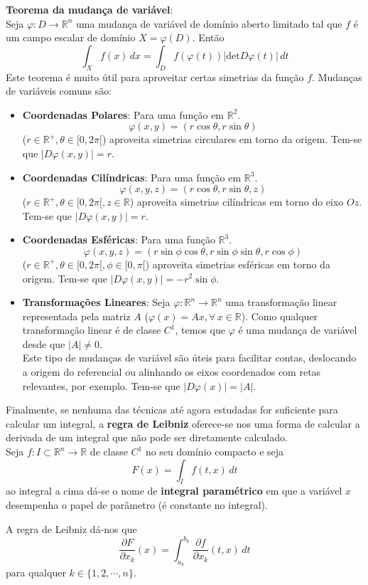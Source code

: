 \documentclass{article}
\newcommand{\R}{\mathbb{R}}
\begin{document}
\textbf{Teorema da mudança de variável}:\\
Seja $\varphi: D \to \R^n$ uma mudança de variável de domínio aberto limitado tal que $f$ é um campo escalar de domínio $X=\varphi(D)$. Então
$$
\int_X f(x) \, dx = \int_D f(\varphi(t)) |\text{det} D \varphi(t)| \, dt
$$
Este teorema é muito útil para aproveitar certas simetrias da função $f$. Mudanças de variáveis comuns são:
\begin{itemize}
	\item \textbf{Coordenadas Polares}: Para uma função em $\R^2$.
	$$ \varphi (x,y) = (r \cos \theta, r \sin \theta) $$
	($r \in \R^+, \theta \in [0, 2\pi[$) aproveita simetrias circulares em torno da origem. Tem-se que $|D\varphi(x,y)| = r$.
	\item \textbf{Coordenadas Cilíndricas}: Para uma função em $\R^3$.
	$$ \varphi(x,y,z) = (r \cos \theta, r \sin \theta, z) $$
	($r \in \R^+, \theta \in [0,2\pi[, z \in \R$) aproveita simetrias cilíndricas em torno do eixo $Oz$. Tem-se que $|D\varphi(x,y)| = r$.
	\item \textbf{Coordenadas Esféricas}: Para uma função $\R^3$.
	$$ \varphi (x,y,z) = (r \sin \phi \cos \theta, r\sin \phi \sin \theta, r \cos \phi)	$$
	($r \in \R^+, \theta \in [0,2\pi[, \phi \in [0,\pi[$) aproveita simetrias esféricas em torno da origem. Tem-se que $|D\varphi(x,y)| = -r^2 \sin \phi$.
	\item \textbf{Transformações Lineares}: Seja $\varphi: \R^n \to \R^n$ uma transformação linear representada pela matriz $A$ ($\varphi(x) = Ax, \forall \, x \in \R$). Como qualquer transformação linear é de classe $C^1$, temos que $\varphi$ é uma mudança de variável desde que $|A| \neq 0$.\\
	Este tipo de mudanças de variável são úteis para facilitar contas, deslocando a origem do referencial ou alinhando os eixos coordenados com retas relevantes, por exemplo. Tem-se que $|D\varphi(x)|=|A|$. 
\end{itemize}
Finalmente, se nenhuma das técnicas até agora estudadas for suficiente para calcular um integral, a \textbf{regra de Leibniz} oferece-se nos uma forma de calcular a derivada de um integral que não pode ser diretamente calculado.\\
Seja $f: I \subset \R^n \to \R$ de classe $C^1$ no seu domínio compacto e seja 
$$
F(x) = \int_I f(t,x) \, dt
$$
ao integral a cima dá-se o nome de \textbf{integral paramétrico} em que a variável $x$ desempenha o papel de parâmetro (é constante no integral).

A regra de Leibniz dá-nos que
$$
\frac{\partial F}{\partial x_k} (x) = \int_{a_k}^{b_k} \frac{\partial f}{\partial x_k} (t,x) \, dt
$$
para qualquer $k \in \{ 1, 2, \cdots , n \}$.
\end{document}
